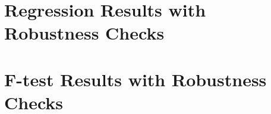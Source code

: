\restoregeometry
\section*{Regression Results with Robustness Checks}
\label{tab:newey1}
\label{tab:overlap1}
\label{tab:overlap2}

\section*{F-test Results with Robustness Checks}
\label{tab:ftest1}
\label{tab:ftest2}
\label{tab:ftestOverlap1}
\label{tab:ftestOverlap2}



